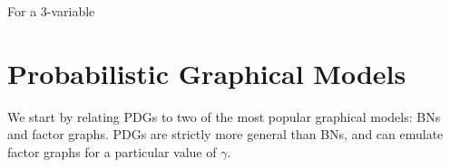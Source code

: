 \documentclass{article}
\begin{document}
    \begin{example}
        For a 3-variable
    \end{example}
	


	
	
	
	\section{Probabilistic Graphical Models}
	
	\label{sec:other-graphical-models} 
	We start by relating
	PDGs to two of the most popular graphical models: BNs and factor
	graphs. PDGs are strictly more general than BNs, and can emulate factor graphs
	for a particular value of $\gamma$. 
\end{document}
